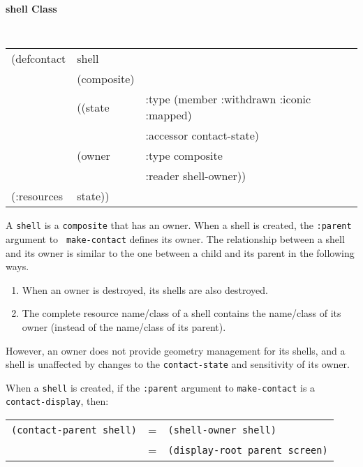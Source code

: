 {\samepage 
{\large {\bf shell \hfill Class}} 
\begin{flushright} \parbox[t]{6.125in}{
\tt
\begin{tabular}{lll}
\raggedright
(defcontact & shell  & \\ 
& (composite) & \\
& ((state     &  :type (member :withdrawn :iconic :mapped)\\
&	      &  :accessor contact-state) \\  
&  (owner     &  :type     composite\\
&	      & :reader   shell-owner))\\
(:resources & state))

\end{tabular}
\rm

}\end{flushright}}




A {\tt shell} is a {\tt composite} that has an owner.
When a shell is created, the {\tt :parent} argument to {\tt
make-contact} defines its owner.  The relationship
between a shell and its
owner is similar to the one between a child and its parent in the
following ways.

\begin{enumerate}
\item When an owner is destroyed, its shells are also destroyed.
\item The complete resource name/class of a shell contains the name/class
	   of its owner (instead of the name/class of its parent).
\end{enumerate}

However, an owner does not provide geometry management for its shells, and a
shell is unaffected by changes to the {\tt contact-state} and sensitivity
of its owner.

When a {\tt shell} is created, if the {\tt :parent} argument to
{\tt make-contact} is a {\tt contact-display}, then:

\begin{center}
\begin{tabular}{lll}
{\tt (contact-parent shell)} & =  & {\tt (shell-owner shell)}\\
                             & =  &{\tt (display-root parent screen)}\\
\end{tabular} \end{center}

